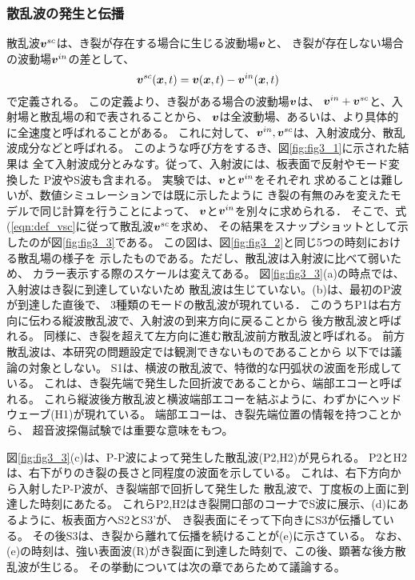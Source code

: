 \subsubsection{散乱波の発生と伝播}
散乱波$\mbox{\boldmath $v$}^{sc}$は、き裂が存在する場合に生じる波動場$\mbox{\boldmath $v$}$と、
き裂が存在しない場合の波動場$\mbox{\boldmath $v$}^{in}$の差として、
\begin{equation}
	\fat{v}^{sc}(\fat{x},t)=\fat{v}(\fat{x},t)-\fat{v}^{in}(\fat{x},t)
	\label{eqn:def_vsc}
\end{equation}
で定義される。
この定義より、き裂がある場合の波動場$\mbox{\boldmath $v$}$は、
$\mbox{\boldmath $v$}^{in}+\mbox{\boldmath $v$}^{sc}$と、入射場と散乱場の和で表されることから、
$\mbox{\boldmath $v$}$は全波動場、あるいは、より具体的に全速度と呼ばれることがある。
これに対して、$\mbox{\boldmath $v$}^{in},\mbox{\boldmath $v$}^{sc}$は、入射波成分、散乱波成分などと呼ばれる。
このような呼び方をするき、図\ref{fig:fig3_1}に示された結果は
全て入射波成分とみなす。従って、入射波には、板表面で反射やモード変換した
P波やS波も含まれる。
実験では、$\mbox{\boldmath $v$}$と$\mbox{\boldmath $v$}^{in}$をそれぞれ
求めることは難しいが、数値シミュレーションでは既に示したように
き裂の有無のみを変えたモデルで同じ計算を行うことによって、
$\mbox{\boldmath $v$}$と$\mbox{\boldmath $v$}^{in}$を別々に求められる．
そこで、式(\ref{eqn:def_vsc}に従って散乱波$\mbox{\boldmath $v$}^{sc}$を求め、
その結果をスナップショットとして示したのが図\ref{fig:fig3_3}である。
この図は、図\ref{fig:fig3_2}と同じ5つの時刻における散乱場の様子を
示したものである。ただし、散乱波は入射波に比べて弱いため、
カラー表示する際のスケールは変えてある。
図\ref{fig:fig3_3}(a)の時点では、入射波はき裂に到達していないため
散乱波は生じていない。(b)は、最初のP波が到達した直後で、
3種類のモードの散乱波が現れている．
このうちP1は右方向に伝わる縦波散乱波で、入射波の到来方向に戻ることから
後方散乱波と呼ばれる。
同様に、き裂を超えて左方向に進む散乱波前方散乱波と呼ばれる。
前方散乱波は、本研究の問題設定では観測できないものであることから
以下では議論の対象としない。
S1は、横波の散乱波で、特徴的な円弧状の波面を形成している。
これは、き裂先端で発生した回折波であることから、端部エコーと呼ばれる。
これら縦波後方散乱波と横波端部エコーを結ぶように、わずかにヘッドウェーブ(H1)が現れている。
端部エコーは、き裂先端位置の情報を持つことから、
超音波探傷試験では重要な意味をもつ。

図\ref{fig:fig3_3}(c)は、P-P波によって発生した散乱波(P2,H2)が見られる。
P2とH2は、右下がりのき裂の長さと同程度の波面を示している。
これは、右下方向から入射したP-P波が、き裂端部で回折して発生した
散乱波で、丁度板の上面に到達した時刻にあたる。
これらP2,H2はき裂開口部のコーナでS波に展示、(d)にあるように、板表面方へS2とS3'が、
き裂表面にそって下向きにS3が伝播している。
その後S3は、き裂から離れて伝播を続けることが(e)に示さている。
なお、(e)の時刻は、強い表面波(R)がき裂面に到達した時刻で、この後、顕著な後方散乱波が生じる。
その挙動については次の章であらためて議論する。
%
